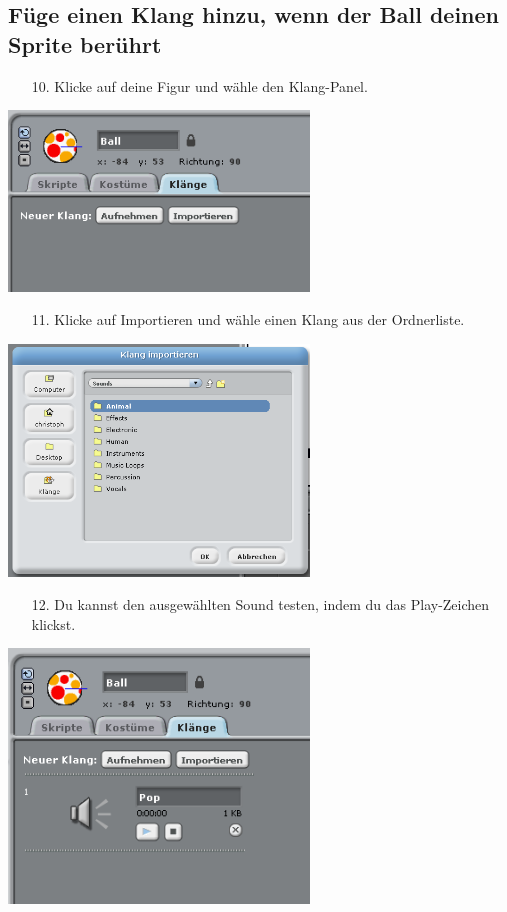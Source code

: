 \subsection{Füge einen Klang hinzu, wenn der Ball deinen Sprite berührt}
\begin{itemize}
\item[10.] Klicke auf deine Figur und wähle den Klang-Panel.
\end{itemize}
\includegraphics[width=0.6\textwidth]{images/aufgabe3_ton1.png}
\begin{itemize}
\item[11.] Klicke auf Importieren und wähle einen Klang aus der Ordnerliste.
\end{itemize}
\includegraphics[width=0.6\textwidth]{images/aufgabe3_ton2.png} 
\begin{itemize}
\item[12.] Du kannst den ausgewählten Sound testen, indem du das Play-Zeichen klickst.
\end{itemize}
\includegraphics[width=0.6\textwidth]{images/aufgabe3_ton3.png}
